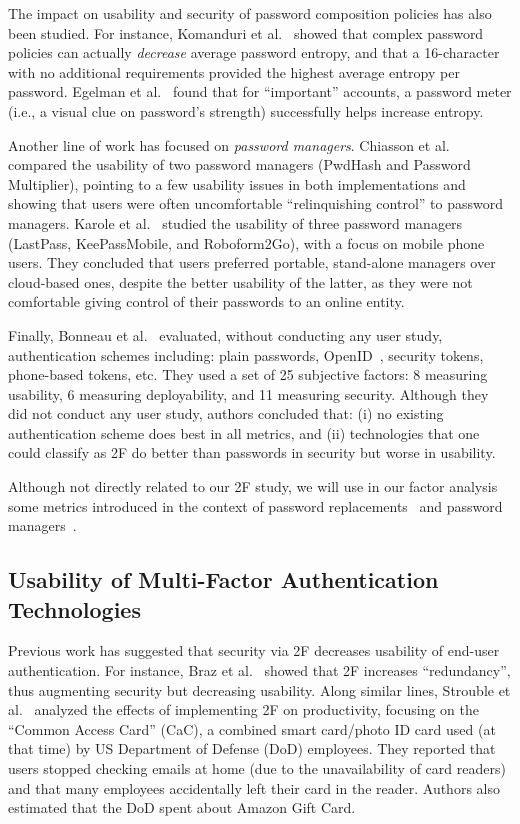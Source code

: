 \documentclass[conference]{IEEEtran}
\begin{document}
The impact on usability and security of password composition policies has also been studied. For instance, Komanduri et al.~\cite{komanduri2011passwords} showed that complex password policies can actually \textit{decrease} average password entropy, and that a 16-character with no additional requirements provided the highest average entropy per password. 
Egelman et al.~\cite{egelman2013does} found that for
``important'' accounts, a password meter (i.e., a visual clue on password's strength)  successfully helps increase entropy.  

Another line of work has focused on {\em password managers}.
Chiasson et al.~\cite{chiasson2006usability} compared the usability of two password managers (PwdHash and Password Multiplier), pointing to a few usability issues in both implementations and showing that users were often uncomfortable ``relinquishing control'' to password managers. 
Karole et al.~\cite{karole2011comparative} studied the usability of three password managers (LastPass, KeePassMobile, and Roboform2Go), with a focus on mobile phone users. They concluded that users preferred portable, stand-alone managers over cloud-based ones, despite the better usability of the latter, as they were not comfortable giving control of their passwords to an online entity. 

Finally, Bonneau et al.~\cite{bonneau2012quest} evaluated, without conducting any user study, authentication schemes including: plain passwords, OpenID~\cite{recordon2006openid}, security tokens, phone-based tokens, etc. They used a set of 25 subjective factors: 8 measuring usability, 6 measuring deployability, and 11 measuring security. Although they did not conduct any user study, authors concluded that: (i) no existing authentication scheme does best in all metrics, and (ii) technologies that one could classify as 2F do better than passwords in security but worse in usability.

Although not directly related to our 2F study, we will use in our factor analysis some metrics introduced in the context of password replacements~\cite{bonneau2012quest} and password managers~\cite{karole2011comparative}. 

\subsection{Usability of Multi-Factor Authentication Technologies}



Previous work has suggested that security via 2F decreases usability of end-user authentication. For instance, Braz et al.~\cite{braz2006security} showed that 2F increases ``redundancy'', thus augmenting security but decreasing usability. Along similar lines, Strouble et al.~\cite{strouble2009productivity} analyzed the effects of implementing 2F on productivity, focusing on the ``Common Access Card'' (CaC), a combined smart card/photo ID card used (at that time) by US Department of Defense (DoD) employees. They reported that users stopped checking emails at home (due to the unavailability of card readers) and that many employees accidentally left their card in the reader. Authors also estimated that the DoD spent about  Amazon Gift Card.
\end{document}
